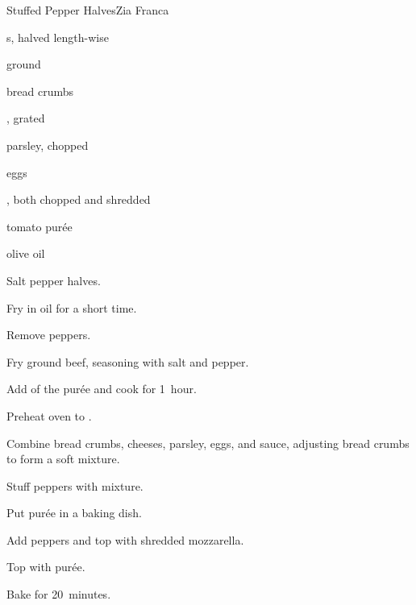 \begin{recipe}{Stuffed Pepper Halves}{Zia Franca}{}

\begin{ingredients}
\item {}s, halved length-wise
\item ground 
\item bread crumbs
\item {}, grated
\item parsley, chopped
\item eggs
\item {}, both chopped and shredded
\item tomato pur\'ee
\item olive oil
\end{ingredients}

\begin{directions}
\item Salt pepper halves.
\item Fry in oil for a short time.
\item Remove peppers.
\item Fry ground beef, seasoning with salt and pepper.
\item Add \half{} of the pur\'ee and cook for 1~hour.
\item Preheat oven to .
\item Combine bread crumbs, cheeses, parsley, eggs, and sauce, adjusting bread crumbs to form a soft mixture.
\item Stuff peppers with mixture.
\item Put pur\'ee in a baking dish.
\item Add peppers and top with shredded mozzarella.
\item Top with pur\'ee.
\item Bake for 20~minutes.
\end{directions}

\end{recipe}

